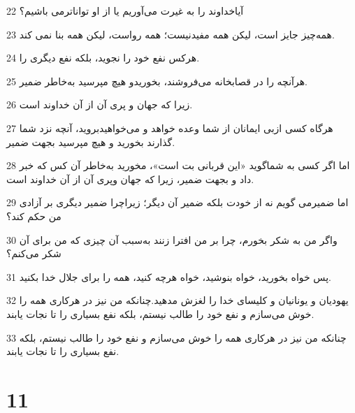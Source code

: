 \par 22 آیاخداوند را به غیرت می‌آوریم یا از او تواناترمی باشیم؟
\par 23 همه‌چیز جایز است، لیکن همه مفیدنیست؛ همه رواست، لیکن همه بنا نمی کند.
\par 24 هرکس نفع خود را نجوید، بلکه نفع دیگری را.
\par 25 هرآنچه را در قصابخانه می‌فروشند، بخوریدو هیچ مپرسید به‌خاطر ضمیر.
\par 26 زیرا که جهان و پری آن از آن خداوند است.
\par 27 هرگاه کسی ازبی ایمانان از شما وعده خواهد و می‌خواهیدبروید، آنچه نزد شما گذارند بخورید و هیچ مپرسید بجهت ضمیر.
\par 28 اما اگر کسی به شماگوید «این قربانی بت است»، مخورید به‌خاطر آن کس که خبر داد و بجهت ضمیر، زیرا که جهان وپری آن از آن خداوند است.
\par 29 اما ضمیرمی گویم نه از خودت بلکه ضمیر آن دیگر؛ زیراچرا ضمیر دیگری بر آزادی من حکم کند؟
\par 30 واگر من به شکر بخورم، چرا بر من افترا زنند به‌سبب آن چیزی که من برای آن شکر می‌کنم؟
\par 31 پس خواه بخورید، خواه بنوشید، خواه هرچه کنید، همه را برای جلال خدا بکنید.
\par 32 یهودیان و یونانیان و کلیسای خدا را لغزش مدهید.چنانکه من نیز در هرکاری همه را خوش می‌سازم و نفع خود را طالب نیستم، بلکه نفع بسیاری را تا نجات یابند.
\par 33 چنانکه من نیز در هرکاری همه را خوش می‌سازم و نفع خود را طالب نیستم، بلکه نفع بسیاری را تا نجات یابند.

\chapter{11}

